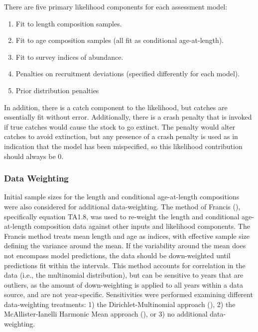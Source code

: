 \documentclass[
]{scrartcl}
\providecommand{\tightlist}{%
  \setlength{\itemsep}{0pt}\setlength{\parskip}{0pt}}\usepackage{longtable,booktabs,array}
\begin{document}
There are five primary likelihood components for each assessment model:

\begin{enumerate}
\def\labelenumi{\arabic{enumi}.}
\tightlist
\item
  Fit to length composition samples.
\item
  Fit to age composition samples (all fit as conditional age-at-length).
\item
  Fit to survey indices of abundance.
\item
  Penalties on recruitment deviations (specified differently for each
  model).
\item
  Prior distribution penalties
\end{enumerate}

In addition, there is a catch component to the likelihood, but catches
are essentially fit without error. Additionally, there is a crash
penalty that is invoked if true catches would cause the stock to go
extinct. The penalty would alter catches to avoid extinction, but any
presence of a crash penalty is used as in indication that the model has
been mispecified, so this likelihood contribution should always be 0.

\subsubsection{Data Weighting}\label{data-weighting}

Initial sample sizes for the length and conditional age-at-length
compositions were also considered for additional data-weighting. The
method of Francis (), specifically
equation TA1.8, was used to re-weight the length and conditional
age-at-length composition data against other inputs and likelihood
components. The Francis method treats mean length and age as indices,
with effective sample size defining the variance around the mean. If the
variability around the mean does not encompass model predictions, the
data should be down-weighted until predictions fit within the intervals.
This method accounts for correlation in the data (i.e., the multinomial
distribution), but can be sensitive to years that are outliers, as the
amount of down-weighting is applied to all years within a data source,
and are not year-specific. Sensitivities were performed examining
different data-weighting treatments: 1) the Dirichlet-Multinomial
approach (), 2) the McAllister-Ianelli Harmonic Mean approach
(),
or 3) no additional data-weighting.
\end{document}
